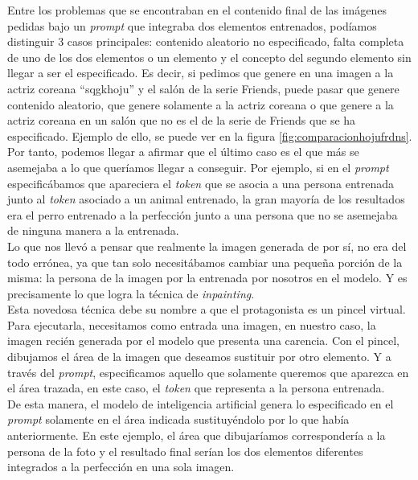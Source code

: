 \begin{itemize}
Entre los problemas que se encontraban en el contenido final de las imágenes pedidas bajo un \textit{prompt} que integraba dos elementos entrenados, podíamos distinguir 3 casos principales: contenido aleatorio no especificado, falta completa de uno de los dos elementos o un elemento y el concepto del segundo elemento sin llegar a ser el especificado. Es decir, si pedimos que genere en una imagen a la actriz coreana ``sqgkhoju'' y el salón de la serie Friends, puede pasar que genere contenido aleatorio, que genere solamente a la actriz coreana o que genere a la actriz coreana en un salón que no es el de la serie de Friends que se ha especificado. Ejemplo de ello, se puede ver en la figura \ref{fig:comparacionhojufrdns}. \\

Por tanto, podemos llegar a afirmar que el último caso es el que más se asemejaba a lo que queríamos llegar a conseguir. Por ejemplo, si en el \textit{prompt} especificábamos que apareciera el \textit{token} que se asocia a una persona entrenada junto al \textit{token} asociado a un animal entrenado, la gran mayoría de los resultados era el perro entrenado a la perfección junto a una persona que no se asemejaba de ninguna manera a la entrenada. \\ 

Lo que nos llevó a pensar que realmente la imagen generada de por sí, no era del todo errónea, ya que tan solo necesitábamos cambiar una pequeña porción de la misma: la persona de la imagen por la entrenada por nosotros en el modelo. Y es precisamente lo que logra la técnica de \textit{inpainting}. \\

Esta novedosa técnica debe su nombre a que el protagonista es un pincel virtual. Para ejecutarla, necesitamos como entrada una imagen, en nuestro caso, la imagen recién generada por el modelo que presenta una carencia. Con el pincel, dibujamos el área de la imagen que deseamos sustituir por otro elemento. Y a través del \textit{prompt}, especificamos aquello que solamente queremos que aparezca en el área trazada, en este caso, el \textit{token} que representa a la persona entrenada. \\

De esta manera, el modelo de inteligencia artificial genera lo especificado en el \textit{prompt} solamente en el área indicada sustituyéndolo por lo que había anteriormente. En este ejemplo, el área que dibujaríamos correspondería a la persona de la foto y el resultado final serían los dos elementos diferentes integrados a la perfección en una sola imagen. \\


\end{itemize}
